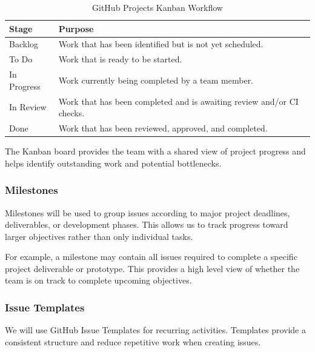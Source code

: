 \documentclass{article}
\begin{document}
\begin{table}[H]
    \centering
    \begin{tabular}{|l|p{9cm}|}
        \hline
        \textbf{Stage} & \textbf{Purpose} \\ \hline

        Backlog &
        Work that has been identified but is not yet scheduled. \\ \hline

        To Do &
        Work that is ready to be started. \\ \hline

        In Progress &
        Work currently being completed by a team member. \\ \hline

        In Review &
        Work that has been completed and is awaiting review and/or CI checks. \\ \hline

        Done &
        Work that has been reviewed, approved, and completed. \\ \hline
    \end{tabular}

    \caption{GitHub Projects Kanban Workflow}
    \label{tab:kanban}
\end{table}

The Kanban board provides the team with a shared view of project progress
and helps identify outstanding work and potential bottlenecks.


\subsubsection{Milestones}

Milestones will be used to group issues according to major project deadlines,
deliverables, or development phases. This allows us to track progress toward
larger objectives rather than only individual tasks.

For example, a milestone may contain all issues required to complete a
specific project deliverable or prototype. This provides a high level view
of whether the team is on track to complete upcoming objectives.


\subsubsection{Issue Templates}

We will use GitHub Issue Templates for recurring activities. Templates
provide a consistent structure and reduce repetitive work when creating
issues.
\end{document}
